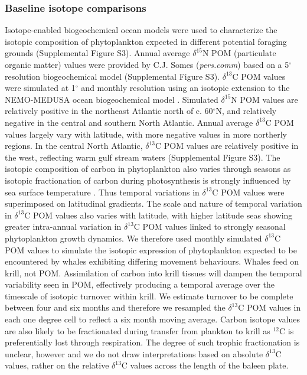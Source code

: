\documentclass[a4paper,12pt]{article}
\begin{document}
\subsubsection{Baseline isotope comparisons}
Isotope-enabled biogeochemical ocean models \cite{magozzi2017using,schmittner2016complementary} were used to characterize the isotopic composition of phytoplankton expected in different potential foraging grounds (Supplemental Figure S3). 
Annual average $\delta^{15}$N POM (particulate organic matter) values were provided by C.J. Somes (\textit{pers.comm}) based on a 5$^{\circ}$ resolution biogeochemical model (Supplemental Figure S3). 
$\delta^{13}$C POM values were simulated at 1$^{\circ}$ and monthly resolution using an isotopic extension to the NEMO-MEDUSA ocean biogeochemical model \cite{magozzi2017using,yool2013medusa}. 
Simulated  $\delta^{15}$N POM values are relatively positive in the northeast Atlantic north of c. 60$^{\circ}$N, and relatively negative in the central and southern North Atlantic. 
Annual average $\delta^{13}$C POM values largely vary with latitude, with more negative values in more northerly regions. 
In the central North Atlantic, $\delta^{13}$C POM values are relatively positive in the west, reflecting warm gulf stream waters (Supplemental Figure S3). 
The isotopic composition of carbon in phytoplankton also varies through seasons as isotopic fractionation of carbon during photosynthesis is strongly influenced by sea surface temperature \cite{magozzi2017using,laws1995dependence}.
Thus temporal variations in $\delta^{13}$C POM values were superimposed on latitudinal gradients. 
The scale and nature of temporal variation in $\delta^{13}$C POM values also varies with latitude, with higher latitude seas showing greater intra-annual variation in $\delta^{13}$C POM values linked to strongly seasonal phytoplankton growth dynamics. 
We therefore used monthly simulated $\delta^{13}$C POM values to simulate the isotopic expression of phytoplankton expected to be encountered by whales exhibiting differing movement behaviours.
Whales feed on krill, not POM. 
Assimilation of carbon into krill tissues will dampen the temporal variability seen in POM, effectively producing a temporal average over the timescale of isotopic turnover within krill. 
We estimate turnover to be complete between four and six months and therefore we resampled the $\delta^{13}$C POM values in each one degree cell to reflect a six month moving average. 
Carbon isotope values are also likely to be fractionated during transfer from plankton to krill as $^{12}$C  is preferentially lost through respiration. 
The degree of such trophic fractionation is unclear, however and we do not draw interpretations based on absolute $\delta^{13}$C values, rather on the relative $\delta^{13}$C  values across the length of the baleen plate.
\end{document}
